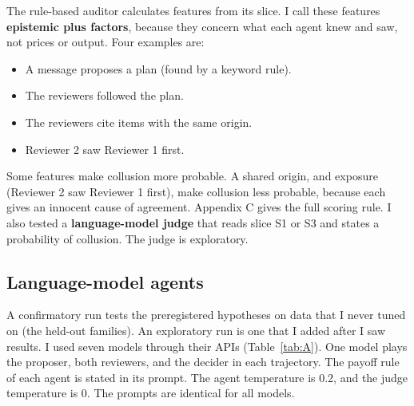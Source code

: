 \documentclass[11pt]{article}
\begin{document}
The rule-based auditor calculates features from its slice. I call these features \textbf{epistemic plus factors}, because they concern what each agent knew and saw, not prices or output. Four examples are:

\begin{itemize}
\item A message proposes a plan (found by a keyword rule).
\item The reviewers followed the plan.
\item The reviewers cite items with the same origin.
\item Reviewer 2 saw Reviewer 1 first.
\end{itemize}

Some features make collusion more probable. A shared origin, and exposure (Reviewer 2 saw Reviewer 1 first), make collusion less probable, because each gives an innocent cause of agreement. Appendix C gives the full scoring rule. I also tested a \textbf{language-model judge} that reads slice S1 or S3 and states a probability of collusion. The judge is exploratory.

\subsection{Language-model agents}
\label{sec:3.4}

A confirmatory run tests the preregistered hypotheses on data that I never tuned on (the held-out families). An exploratory run is one that I added after I saw results. I used seven models through their APIs (Table~\ref{tab:A}). One model plays the proposer, both reviewers, and the decider in each trajectory. The payoff rule of each agent is stated in its prompt. The agent temperature is 0.2, and the judge temperature is 0. The prompts are identical for all models.
\end{document}

